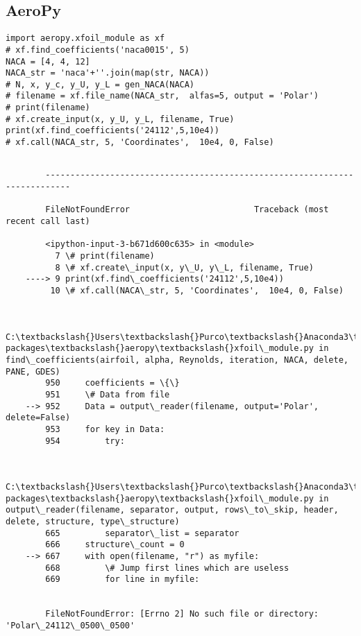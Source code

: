 \documentclass[11pt]{article}
\begin{document}
    \hypertarget{aeropy}{%
\subsection{AeroPy}\label{aeropy}}
%
\begin{lstlisting}
import aeropy.xfoil_module as xf
# xf.find_coefficients('naca0015', 5)
NACA = [4, 4, 12]
NACA_str = 'naca'+''.join(map(str, NACA))
# N, x, y_c, y_U, y_L = gen_NACA(NACA)
# filename = xf.file_name(NACA_str,  alfas=5, output = 'Polar')
# print(filename)
# xf.create_input(x, y_U, y_L, filename, True)
print(xf.find_coefficients('24112',5,10e4))
# xf.call(NACA_str, 5, 'Coordinates',  10e4, 0, False)
\end{lstlisting}%
    \begin{Verbatim}[commandchars=\\\{\}]

        ---------------------------------------------------------------------------

        FileNotFoundError                         Traceback (most recent call last)

        <ipython-input-3-b671d600c635> in <module>
          7 \# print(filename)
          8 \# xf.create\_input(x, y\_U, y\_L, filename, True)
    ----> 9 print(xf.find\_coefficients('24112',5,10e4))
         10 \# xf.call(NACA\_str, 5, 'Coordinates',  10e4, 0, False)
    

        C:\textbackslash{}Users\textbackslash{}Purco\textbackslash{}Anaconda3\textbackslash{}lib\textbackslash{}site-packages\textbackslash{}aeropy\textbackslash{}xfoil\_module.py in find\_coefficients(airfoil, alpha, Reynolds, iteration, NACA, delete, PANE, GDES)
        950     coefficients = \{\}
        951     \# Data from file
    --> 952     Data = output\_reader(filename, output='Polar', delete=False)
        953     for key in Data:
        954         try:
    

        C:\textbackslash{}Users\textbackslash{}Purco\textbackslash{}Anaconda3\textbackslash{}lib\textbackslash{}site-packages\textbackslash{}aeropy\textbackslash{}xfoil\_module.py in output\_reader(filename, separator, output, rows\_to\_skip, header, delete, structure, type\_structure)
        665         separator\_list = separator
        666     structure\_count = 0
    --> 667     with open(filename, "r") as myfile:
        668         \# Jump first lines which are useless
        669         for line in myfile:
    

        FileNotFoundError: [Errno 2] No such file or directory: 'Polar\_24112\_0500\_0500'

    \end{Verbatim}
\end{document}
